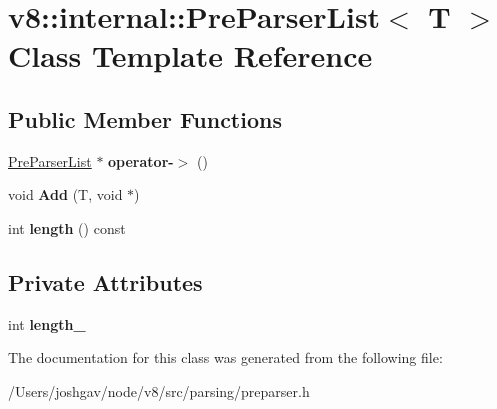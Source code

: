\hypertarget{classv8_1_1internal_1_1_pre_parser_list}{}\section{v8\+:\+:internal\+:\+:Pre\+Parser\+List$<$ T $>$ Class Template Reference}
\label{classv8_1_1internal_1_1_pre_parser_list}
\subsection*{Public Member Functions}
\begin{DoxyCompactItemize}
\item 
\hyperlink{classv8_1_1internal_1_1_pre_parser_list}{Pre\+Parser\+List} $\ast$ {\bfseries operator-\/$>$} ()\hypertarget{classv8_1_1internal_1_1_pre_parser_list_a0c8aa8a09342d2fed156999a28dedf12}{}\label{classv8_1_1internal_1_1_pre_parser_list_a0c8aa8a09342d2fed156999a28dedf12}

\item 
void {\bfseries Add} (T, void $\ast$)\hypertarget{classv8_1_1internal_1_1_pre_parser_list_af1e1d7ed48c41be1a6fadada85c05d41}{}\label{classv8_1_1internal_1_1_pre_parser_list_af1e1d7ed48c41be1a6fadada85c05d41}

\item 
int {\bfseries length} () const \hypertarget{classv8_1_1internal_1_1_pre_parser_list_ae8681c472c8e1635511ff1014bbfdcf0}{}\label{classv8_1_1internal_1_1_pre_parser_list_ae8681c472c8e1635511ff1014bbfdcf0}

\end{DoxyCompactItemize}
\subsection*{Private Attributes}
\begin{DoxyCompactItemize}
\item 
int {\bfseries length\+\_\+}\hypertarget{classv8_1_1internal_1_1_pre_parser_list_a1e669dc54b4bd971ac882f432ea48c91}{}\label{classv8_1_1internal_1_1_pre_parser_list_a1e669dc54b4bd971ac882f432ea48c91}

\end{DoxyCompactItemize}


The documentation for this class was generated from the following file\+:\begin{DoxyCompactItemize}
\item 
/\+Users/joshgav/node/v8/src/parsing/preparser.\+h\end{DoxyCompactItemize}
